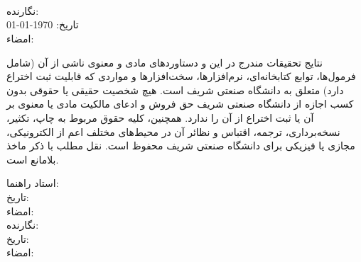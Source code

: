 {\begin{multicols}{2}
\ \\
\ \\
\ \\

نگارنده: \ThesisAuthor\\
تاریخ: 
\today
\\
امضاء: \\
\end{multicols}

نتایج تحقیقات مندرج در این \ThesisType{} و دستاوردهای مادی و معنوی ناشی از آن (شامل فرمول‌ها، توابع کتابخانه‌ای، نرم‌افزارها، سخت‌افزارها و مواردی که قابلیت ثبت اختراع دارد) متعلق به دانشگاه صنعتی شریف است. هیچ شخصیت حقیقی یا حقوقی بدون کسب اجازه از دانشگاه صنعتی شریف حق فروش و ادعای مالکیت مادی یا معنوی بر آن یا ثبت اختراع از آن را ندارد. همچنین، کلیه حقوق مربوط به چاپ، تکثیر، نسخه‌برداری، ترجمه، اقتباس و نظائر آن در محیط‌های مختلف اعم از الکترونیکی، مجازی یا فیزیکی برای دانشگاه صنعتی شریف محفوظ است. نقل مطلب با ذکر ماخذ بلامانع است.


\begin{multicols}{2}
استاد راهنما: \ThesisSupervisor \\
تاریخ: \\
امضاء: \\

نگارنده: \ThesisAuthor\\
تاریخ: \\
امضاء: \\
\end{multicols}
}

